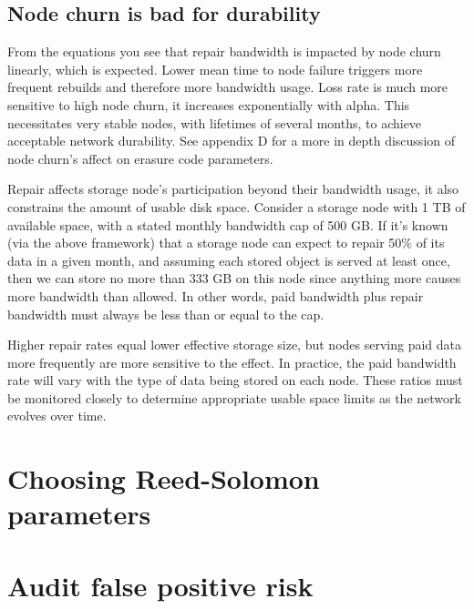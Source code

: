 \documentclass[11pt,fleqn,openany]{book}
\begin{document}
\section{Node churn is bad for durability}\label{appendix:bandwidth-space-limits}
	From the equations you see that repair bandwidth is impacted by node churn linearly, which is expected. Lower mean time to node failure triggers more frequent rebuilds and therefore more bandwidth usage. Loss rate is much more sensitive to high node churn, it increases exponentially with alpha. This necessitates very stable nodes, with lifetimes of several months, to achieve acceptable network durability. See appendix D for a more in depth discussion of node churn's affect on erasure code parameters.

	Repair affects storage node's participation beyond their bandwidth usage, it also constrains the amount of usable disk space. Consider a storage node with 1 TB of available space, with a stated monthly bandwidth cap of 500 GB. If it's known (via the above framework) that a storage node can expect to repair 50\% of its data in a given month, and assuming each stored object is served at least once, then we can store no more than 333 GB on this node since anything more causes more bandwidth than allowed. In other words, paid bandwidth plus repair bandwidth must always be less than or equal to the cap.

    Higher repair rates equal lower effective storage size, but nodes serving paid data more frequently are more sensitive to the effect. In practice, the paid bandwidth rate will vary with the type of data being stored on each node. These ratios must be monitored closely to determine appropriate usable space limits as the network evolves over time.


\chapter{Choosing Reed-Solomon parameters}






\chapter{Audit false positive risk}\label{appendix:audit-false-positive}
\end{document}
